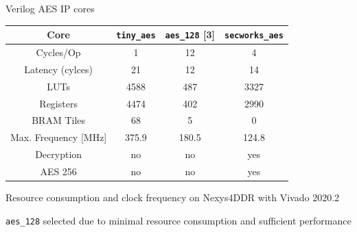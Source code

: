 \documentclass[aspectratio=169, nobackgroundmain]{beamer}
\begin{document}
\begin{frame}[fragile]{Verilog AES IP cores}

\small
  \begin{table}[h]
    \centering
    \begin{tabular}{c|c c c}
        \toprule
        Core &  \verb|tiny_aes| & \verb|aes_128| [3] & \verb|secworks_aes| \\
        \midrule
        Cycles/Op &  1 & 12 & 4\\
        Latency (cylces) & 21 & 12 & 14\\
        LUTs & 4588 & 487 & 3327 \\
        Registers & 4474 & 402 & 2990 \\
        BRAM Tiles & 68 & 5 & 0 \\
        Max. Frequency [MHz] & 375.9 & 180.5 & 124.8 \\
        Decryption & no & no  & yes \\
        AES 256 & no & no & yes\\
        \bottomrule
    \end{tabular}
\end{table}

\centering
\footnotesize
Resource consumption and clock frequency on Nexys4DDR with Vivado 2020.2
\normalsize

\begin{block}{}
  \centering
  \verb|aes_128| selected due to minimal resource consumption and sufficient performance
\end{block}

\end{frame}
\end{document}
